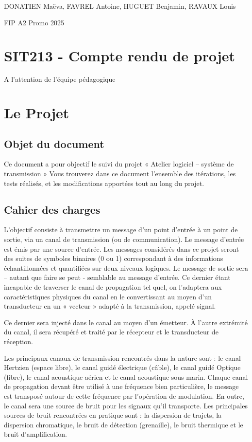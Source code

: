 

DONATIEN Maëva,
FAVREL Antoine,
HUGUET Benjamin,
RAVAUX Louis

FIP A2 Promo 2025

\section{SIT213 - Compte rendu de projet}

A l'attention de l'équipe pédagogique
\newpage
\section{Le Projet}
\subsection{Objet du document}

Ce document a pour objectif le suivi du projet « Atelier logiciel – système de transmission »
Vous trouverez dans ce document l'ensemble des itérations, les tests réalisés, et les modifications apportées tout au long du projet.

\subsection{Cahier des charges}

L’objectif consiste à transmettre un message d’un point d’entrée à un point de sortie, via un canal de transmission (ou de communication). Le message d’entrée est émis par une source d’entrée. Les messages considérés dans ce projet seront des suites de symboles binaires (0 ou 1) correspondant à des informations échantillonnées et quantifiées sur deux niveaux logiques. Le message de sortie sera – autant que faire se peut - semblable au message d’entrée. Ce dernier étant incapable de traverser le canal de propagation tel quel, on l’adaptera aux caractéristiques physiques du canal en le convertissant au moyen d’un transducteur en un « vecteur » adapté à la transmission, appelé signal.

Ce dernier sera injecté dans le canal au moyen d’un émetteur. À l’autre extrémité du canal, il sera récupéré et traité par le récepteur et le transducteur de réception.

Les principaux canaux de transmission rencontrés dans la nature sont : le canal Hertzien (espace libre), le canal guidé électrique (câble), le canal guidé Optique (fibre), le canal acoustique aérien et le canal acoustique sous-marin. Chaque canal de propagation devant être utilisé à une fréquence bien particulière, le message est transposé autour de cette fréquence par l’opération de modulation. En outre, le canal sera une source de bruit pour les signaux qu’il transporte. Les principales sources de bruit rencontrées en pratique sont : la dispersion de trajets, la dispersion chromatique, le bruit de détection (grenaille), le bruit thermique et le bruit d’amplification.

